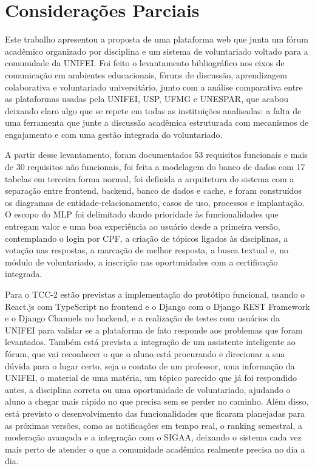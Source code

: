 \section{Considerações Parciais}

Este trabalho apresentou a proposta de uma plataforma web que junta um fórum
acadêmico organizado por disciplina e um sistema de voluntariado voltado para a
comunidade da UNIFEI. Foi feito o levantamento bibliográfico nos eixos de
comunicação em ambientes educacionais, fóruns de discussão, aprendizagem
colaborativa e voluntariado universitário, junto com a análise comparativa entre
as plataformas usadas pela UNIFEI, USP, UFMG e UNESPAR, que acabou deixando
claro algo que se repete em todas as instituições analisadas: a falta de uma
ferramenta que junte a discussão acadêmica estruturada com mecanismos de
engajamento e com uma gestão integrada do voluntariado.

A partir desse levantamento, foram documentados 53 requisitos funcionais e mais
de 30 requisitos não funcionais, foi feita a modelagem do banco de dados com 17
tabelas em terceira forma normal, foi definida a arquitetura do sistema com a
separação entre frontend, backend, banco de dados e cache, e foram construídos
os diagramas de entidade-relacionamento, casos de uso, processos e implantação.
O escopo do MLP foi delimitado dando prioridade às funcionalidades que entregam
valor e uma boa experiência ao usuário desde a primeira versão, contemplando o
login por CPF, a criação de tópicos ligados às disciplinas, a votação nas
respostas, a marcação de melhor resposta, a busca textual e, no módulo de
voluntariado, a inscrição nas oportunidades com a certificação integrada.

Para o TCC-2 estão previstas a implementação do protótipo funcional, usando o
React.js com TypeScript no frontend e o Django com o Django REST Framework e o
Django Channels no backend, e a realização de testes com usuários da UNIFEI
para validar se a plataforma de fato responde aos problemas que foram
levantados. Também está prevista a integração de um assistente inteligente ao
fórum, que vai reconhecer o que o aluno está procurando e direcionar a sua
dúvida para o lugar certo, seja o contato de um professor, uma informação da
UNIFEI, o material de uma matéria, um tópico parecido que já foi respondido
antes, a disciplina correta ou uma oportunidade de voluntariado, ajudando o
aluno a chegar mais rápido no que precisa sem se perder no caminho. Além disso,
está previsto o desenvolvimento das funcionalidades que ficaram planejadas para
as próximas versões, como as notificações em tempo real, o ranking semestral, a
moderação avançada e a integração com o SIGAA, deixando o sistema cada vez mais
perto de atender o que a comunidade acadêmica realmente precisa no dia a dia.